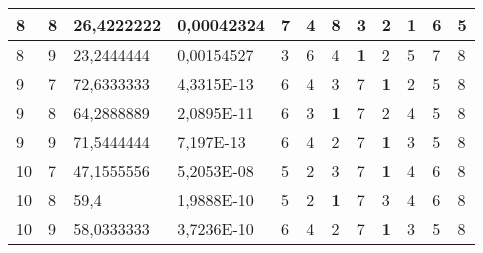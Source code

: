 \documentclass[conference]{IEEEtran}
\begin{document}
\begin{table*}[]
\begin{tabular}{|llll|llllllll|}
		\multicolumn{1}{|l|}{8} & \multicolumn{1}{l|}{8} & \multicolumn{1}{l|}{26,4222222} & 0,00042324 & \multicolumn{1}{l|}{7} & \multicolumn{1}{l|}{4} & \multicolumn{1}{l|}{8} & \multicolumn{1}{l|}{3} & \multicolumn{1}{l|}{2} & \multicolumn{1}{l|}{\textbf{1}} & \multicolumn{1}{l|}{6} & 5 \\ \hline
		\multicolumn{1}{|l|}{8} & \multicolumn{1}{l|}{9} & \multicolumn{1}{l|}{23,2444444} & 0,00154527 & \multicolumn{1}{l|}{3} & \multicolumn{1}{l|}{6} & \multicolumn{1}{l|}{4} & \multicolumn{1}{l|}{\textbf{1}} & \multicolumn{1}{l|}{2} & \multicolumn{1}{l|}{5} & \multicolumn{1}{l|}{7} & 8 \\ \hline
		\multicolumn{1}{|l|}{9} & \multicolumn{1}{l|}{7} & \multicolumn{1}{l|}{72,6333333} & 4,3315E-13 & \multicolumn{1}{l|}{6} & \multicolumn{1}{l|}{4} & \multicolumn{1}{l|}{3} & \multicolumn{1}{l|}{7} & \multicolumn{1}{l|}{\textbf{1}} & \multicolumn{1}{l|}{2} & \multicolumn{1}{l|}{5} & 8 \\ \hline
		\multicolumn{1}{|l|}{9} & \multicolumn{1}{l|}{8} & \multicolumn{1}{l|}{64,2888889} & 2,0895E-11 & \multicolumn{1}{l|}{6} & \multicolumn{1}{l|}{3} & \multicolumn{1}{l|}{\textbf{1}} & \multicolumn{1}{l|}{7} & \multicolumn{1}{l|}{2} & \multicolumn{1}{l|}{4} & \multicolumn{1}{l|}{5} & 8 \\ \hline
		\multicolumn{1}{|l|}{9} & \multicolumn{1}{l|}{9} & \multicolumn{1}{l|}{71,5444444} & 7,197E-13 & \multicolumn{1}{l|}{6} & \multicolumn{1}{l|}{4} & \multicolumn{1}{l|}{2} & \multicolumn{1}{l|}{7} & \multicolumn{1}{l|}{\textbf{1}} & \multicolumn{1}{l|}{3} & \multicolumn{1}{l|}{5} & 8 \\ \hline
		\multicolumn{1}{|l|}{10} & \multicolumn{1}{l|}{7} & \multicolumn{1}{l|}{47,1555556} & 5,2053E-08 & \multicolumn{1}{l|}{5} & \multicolumn{1}{l|}{2} & \multicolumn{1}{l|}{3} & \multicolumn{1}{l|}{7} & \multicolumn{1}{l|}{\textbf{1}} & \multicolumn{1}{l|}{4} & \multicolumn{1}{l|}{6} & 8 \\ \hline
		\multicolumn{1}{|l|}{10} & \multicolumn{1}{l|}{8} & \multicolumn{1}{l|}{59,4} & 1,9888E-10 & \multicolumn{1}{l|}{5} & \multicolumn{1}{l|}{2} & \multicolumn{1}{l|}{\textbf{1}} & \multicolumn{1}{l|}{7} & \multicolumn{1}{l|}{3} & \multicolumn{1}{l|}{4} & \multicolumn{1}{l|}{6} & 8 \\ \hline
		\multicolumn{1}{|l|}{10} & \multicolumn{1}{l|}{9} & \multicolumn{1}{l|}{58,0333333} & 3,7236E-10 & \multicolumn{1}{l|}{6} & \multicolumn{1}{l|}{4} & \multicolumn{1}{l|}{2} & \multicolumn{1}{l|}{7} & \multicolumn{1}{l|}{\textbf{1}} & \multicolumn{1}{l|}{3} & \multicolumn{1}{l|}{5} & 8 \\ \hline

\end{tabular}
\end{table*}
\end{document}
